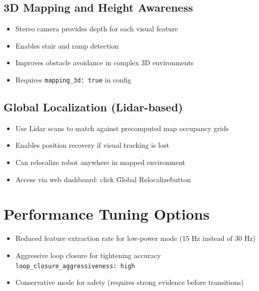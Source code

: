 \subsection{3D Mapping and Height Awareness}
\begin{itemize}
    \item Stereo camera provides depth for each visual feature
    \item Enables stair and ramp detection
    \item Improves obstacle avoidance in complex 3D environments
    \item Requires \texttt{mapping\_3d: true} in config
\end{itemize}

\subsection{Global Localization (Lidar-based)}
\begin{itemize}
    \item Use Lidar scans to match against precomputed map occupancy grids
    \item Enables position recovery if visual tracking is lost
    \item Can relocalize robot anywhere in mapped environment
    \item Access via web dashboard: click \"Global Relocalize\" button
\end{itemize}

\section{Performance Tuning Options}

\begin{itemize}
    \item Reduced feature extraction rate for low-power mode (15 Hz instead of 30 Hz)
    \item Aggressive loop closure for tightening accuracy \texttt{loop\_closure\_aggressiveness: high}
    \item Conservative mode for safety (requires strong evidence before transitions)
\end{itemize}





